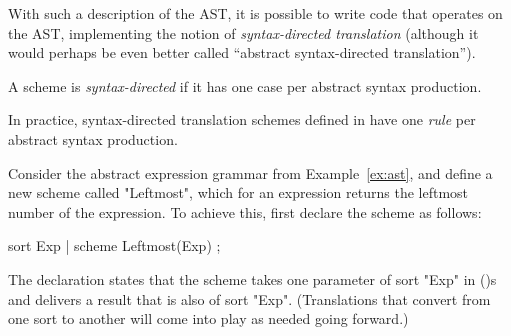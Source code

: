\documentclass[11pt]{article} %
\begin{document}
With such a description of the AST, it is possible to write code that operates on the AST,
implementing the notion of \emph{syntax-directed translation} (although it would perhaps be even
better called ``abstract syntax-directed translation'').

\begin{definition}
  A scheme is \emph{syntax-directed} if it has one case per abstract syntax production.
\end{definition}

In practice, syntax-directed translation schemes defined in \HAX have one \emph{rule} per abstract
syntax production.

\begin{example}\label{ex:leftmost}
  Consider the abstract expression grammar from Example~\ref{ex:ast}, and define a new scheme called
  "Leftmost", which for an expression returns the leftmost number of the expression. To achieve
  this, first declare the scheme as follows:
  \begin{hacs}[xleftmargin=\parindent,xrightmargin=\parindent]
sort Exp | scheme Leftmost(Exp) ;
  \end{hacs}
  The declaration states that the scheme takes one parameter of sort "Exp" in ()s and delivers a
  result that is also of sort "Exp". (Translations that convert from one sort to another will come
  into play as needed going forward.)


\end{example}
\end{document}
